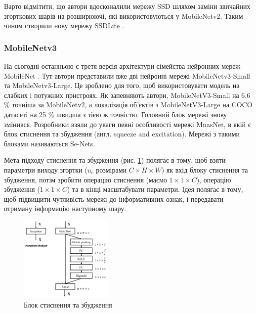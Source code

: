 Варто відмітити, що автори вдосконалили мережу SSD \cite{ssd} шляхом заміни
звичайних згорткових шарів на розширюючі, які
використовуються у MobileNetv2. Таким чином створили нову мережу SSDLite \cite{mobilenetv2}.

\subsubsection{MobileNetv3}

На сьогодні останньою є третя версія архітектури сімейства нейронних мереж MobileNet \cite{mobilenetv3}.
Тут автори представили вже дві нейронні мережі MobileNetv3-Small та MobileNetv3-Large.
Це зроблено для того, щоб використовувати модель на слабких і потужних пристроях.
Як запевняють автори, MobileNetV3-Small на 6.6 \% точніша за MobileNetv2, а локалізація об'єктів
з MobileNetV3-Large на COCO датасеті на 25 \% швидша з тією  ж точністю.
Головний блок мережі знову змінився. Розробники взяли
до уваги певні особливості мережі MnasNet, в якій є блок стиснення та збудження
(англ. squeeze and excitation). Мережі з такими блоками називаються Se-Nets.

Мета підходу стиснення та збудження (рис. \ref{fig:cnn:senet_block}) полягає в тому, щоб взяти параметри
виходу згортки ($u_c$ розмірами $C \times H \times W$)
як вхід блоку стиснення та збудження,
потім зробити операцію стиснення (маємо $1 \times 1 \times C$), операцію збудження ($1 \times 1 \times C$) та
в кінці масштабувати параметри.
Ідея полягає в тому, щоб підвищити чутливість мережі до інформативних ознак,
і передавати отриману інформацію наступному шару.

\begin{figure}[H]
    \centering
    \includegraphics[width=0.4\textwidth]{images/cnn_senet_block}
    \caption{Блок стиснення та збудження      \cite{squeeze_and_excitation_website}
        \label{fig:cnn:senet_block}
    }
\end{figure}

